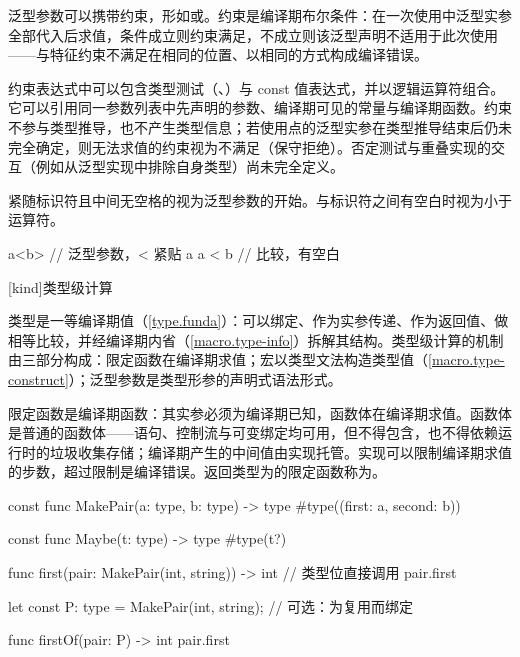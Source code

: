 \pnum
泛型参数可以携带约束，形如或。约束是编译期布尔条件：在一次使用中泛型实参全部代入后求值，条件成立则约束满足，不成立则该泛型声明不适用于此次使用——与特征约束不满足在相同的位置、以相同的方式构成编译错误。

\pnum
约束表达式中可以包含类型测试（、）与 const 值表达式，并以逻辑运算符组合。它可以引用同一参数列表中先声明的参数、编译期可见的常量与编译期函数。约束不参与类型推导，也不产生类型信息；若使用点的泛型实参在类型推导结束后仍未完全确定，则无法求值的约束视为不满足（保守拒绝）。\enternote {}否定测试与重叠实现的交互（例如从泛型实现中排除自身类型）尚未完全定义。 \exitnote

\pnum
紧随标识符且中间无空格的\tcode{<}视为泛型参数的开始。\tcode{<}与标识符之间有空白时视为小于运算符。\enterexample
\begin{codeblock}
a<b>   // 泛型参数，< 紧贴 a
a < b  // 比较，有空白
\end{codeblock}
\exitexample

[kind]{类型级计算}

\pnum
类型是一等编译期值（\ref{type.funda}）：可以绑定、作为实参传递、作为返回值、做相等比较，并经编译期内省（\ref{macro.type-info}）拆解其结构。类型级计算的机制由三部分构成：限定函数在编译期求值；宏以类型文法构造类型值（\ref{macro.type-construct}）；泛型参数是类型形参的声明式语法形式。

\pnum
{}限定函数是编译期函数：其实参必须为编译期已知，函数体在编译期求值。函数体是普通的函数体——语句、控制流与可变绑定均可用，但不得包含，也不得依赖运行时的垃圾收集存储；编译期产生的中间值由实现托管。实现可以限制编译期求值的步数，超过限制是编译错误。返回类型为的限定函数称为。

\enterexample
\begin{codeblock}
const func MakePair(a: type, b: type) -> type {
    #type((first: a, second: b))
}

const func Maybe(t: type) -> type {
    #type(t?)
}

func first(pair: MakePair(int, string)) -> int {   // 类型位直接调用
    pair.first
}

let const P: type = MakePair(int, string);          // 可选：为复用而绑定

func firstOf(pair: P) -> int {
    pair.first
}
\end{codeblock}
\exitexample

